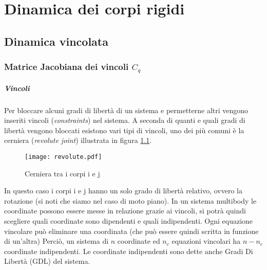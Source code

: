 %
%
%

\chapter{Dinamica dei corpi rigidi}
\label{dinamica_corporigido}
\section{Dinamica vincolata}
\subsection{Matrice Jacobiana dei vincoli $C_q$} \label{sec:Jabobian}
\paragraph{Vincoli}
Per bloccare alcuni gradi di libertà di un sistema e permetterne altri vengono inseriti vincoli (\emph{constraints}) nel sistema. A seconda di quanti e quali gradi di libertà vengono bloccati esistono vari tipi di vincoli, uno dei più comuni è la cerniera (\emph{revolute joint}) illustrata in figura \ref{fig:2.1}.
\begin{figure}[ht]
\centering
\texttt{[image: revolute.pdf]}
\caption{Cerniera tra i corpi i e j}
\label{fig:2.1}
\end{figure}
In questo caso i corpi i e j hanno un solo grado di libertà relativo, ovvero la rotazione (si noti che siamo nel caso di moto piano).
In un sistema multibody le coordinate possono essere messe in relazione grazie ai vincoli, si potrà quindi scegliere quali coordinate sono dipendenti e quali indipendenti. 
Ogni equazione vincolare può eliminare una coordinata (che può essere quindi scritta in funzione di un'altra)
Perciò, un sistema di  $n$ coordinate ed $n_c$ equazioni vincolari ha $n-n_c$ coordinate indipendenti. 
Le coordinate indipendenti sono dette anche Gradi Di Libertà (GDL) del sistema.

